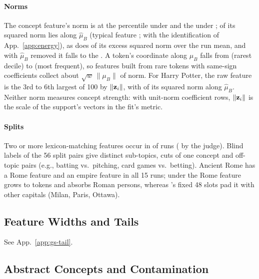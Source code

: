 \paragraph{Norms}
The concept feature's norm is at the  percentile under \ember{} and the  under \cs{};  of its squared norm lies along $\hat\mu_B$ (typical feature ;  with the identification of App.~\ref{app:energy}), as does  of its excess squared norm over the run mean, and with $\hat\mu_B$ removed it falls to the .
A token's coordinate along $\mu_B$ falls from  (rarest decile) to  (most frequent), so features built from rare tokens with same-sign coefficients collect about $\sqrt w\,\|\mu_B\|$ of norm. For Harry Potter, the raw feature is the 3rd to 6th largest of 100 by $\|\mathbf{z}_i\|$, with  of its squared norm along $\hat\mu_B$. Neither norm measures concept strength: with unit-norm coefficient rows, $\|\mathbf{z}_i\|$ is the scale of the support's vectors in the fit's metric.

\paragraph{Splits}
Two or more lexicon-matching features occur in  of runs ( by the judge). Blind labels of the 56 split pairs give  distinct sub-topics,  cuts of one concept and  off-topic pairs (e.g., batting vs.\ pitching, card games vs.\ betting). Ancient Rome has a Rome feature and an empire feature in all 15 runs; under \gs{} the Rome feature grows to  tokens and absorbs Roman persons, whereas \ember{}'s fixed 48 slots pad it with other capitals (Milan, Paris, Ottawa).

\subsection{Feature Widths and Tails}
\label{app:widths}
See App.~\ref{app:gs-tail}.

\subsection{Abstract Concepts and Contamination}
\label{app:robustness}
